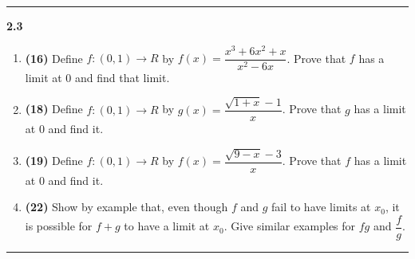\documentclass[fleqn]{article}
\begin{document}
  \rule{15cm}{2pt}

  \textbf{2.3}
  \begin{enumerate}
    \item \textbf{(16)} Define $f: (0, 1) \longrightarrow R$ by $f(x)=\dfrac{x^3+6x^2+x}{x^2-6x}$. Prove that $f$ 
    has a limit at $0$ and find that limit. 

        


    \item \textbf{(18)} Define $f: (0, 1) \longrightarrow R$ by $g(x)=\dfrac{\sqrt{1+x}-1}{x}$. Prove that $g$ has a limit
    at $0$ and find it.

        


    \item \textbf{(19)} Define $f: (0, 1) \longrightarrow R$ by $f(x)=\dfrac{\sqrt{9-x}-3}{x}$. Prove that $f$ has a limit 
    at $0$ and find it.

        


    \item \textbf{(22)} Show by example that, even though $f$ and $g$ fail to have limits at $x_0$, it is possible for
    $f+g$ to have a limit at $x_0$. Give similar examples for $fg$ and $\dfrac{f}{g}$.

        


  \end{enumerate}

  \rule{15cm}{2pt}
\end{document}
